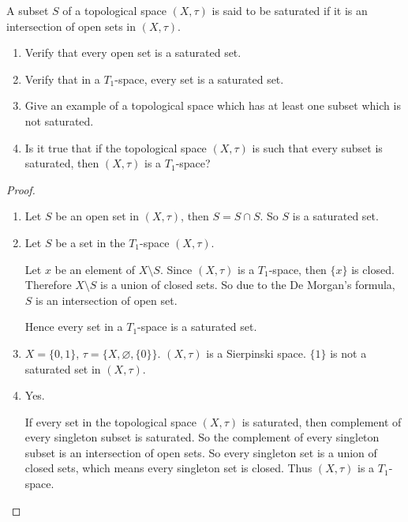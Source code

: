 \begin{exercise}
    A subset $S$ of a topological space $(X, \tau)$ is said to be {\color{red}saturated} if it is an intersection of open sets in $(X, \tau)$.
    \begin{enumerate}[label={(\roman*)}]
        \item Verify that every open set is a saturated set.
        \item Verify that in a $T_{1}$-space, every set is a saturated set.
        \item Give an example of a topological space which has at least one subset which is not saturated.
        \item Is it true that if the topological space $(X, \tau)$ is such that every subset is saturated, then $(X, \tau)$ is a $T_{1}$-space?
    \end{enumerate}
\end{exercise}

\begin{proof}
    \begin{enumerate}[label={(\roman*)}]
        \item Let $S$ be an open set in $(X, \tau)$, then $S = S\cap S$. So $S$ is a saturated set.
        \item Let $S$ be a set in the $T_{1}$-space $(X, \tau)$.

              Let $x$ be an element of $X\setminus S$. Since $(X, \tau)$ is a $T_{1}$-space, then $\{ x \}$ is closed. Therefore $X\setminus S$ is a union of closed sets. So due to the De Morgan's formula, $S$ is an intersection of open set.

              Hence every set in a $T_{1}$-space is a saturated set.
        \item $X = \{ 0, 1 \}$, $\tau = \{ X, \varnothing, \{ 0 \} \}$. $(X, \tau)$ is a Sierpinski space. $\{ 1 \}$ is not a saturated set in $(X, \tau)$.
        \item Yes.

              If every set in the topological space $(X, \tau)$ is saturated, then complement of every singleton subset is saturated. So the complement of every singleton subset is an intersection of open sets. So every singleton set is a union of closed sets, which means every singleton set is closed. Thus $(X, \tau)$ is a $T_{1}$-space.
    \end{enumerate}
\end{proof}
